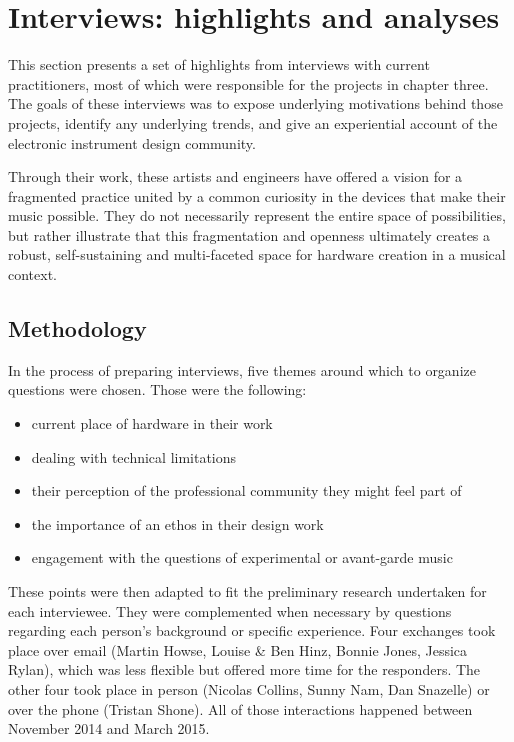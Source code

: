 \chapter{Interviews: highlights and analyses}\label{interviews}
This section presents a set of highlights from interviews with current practitioners, most of which were responsible for the projects in chapter three. The goals of these interviews was to expose underlying motivations behind those projects, identify any underlying trends, and give an experiential account of the electronic instrument design community. 

Through their work, these artists and engineers have offered a vision for a fragmented practice united by a common curiosity in the devices that make their music possible. They do not necessarily represent the entire space of possibilities, but rather illustrate that this fragmentation and openness ultimately creates a robust, self-sustaining and multi-faceted space for hardware creation in a musical context.

\section{Methodology}

In the process of preparing interviews, five themes around which to organize questions were chosen. Those were the following: 

\begin{itemize}
	\item current place of hardware in their work 
	\item dealing with technical limitations
	\item their perception of the professional community they might feel part of
	\item the importance of an ethos in their design work
	\item engagement with the questions of experimental or avant-garde music 
	\end{itemize}

These points were then adapted to fit the preliminary research undertaken for each interviewee. They were complemented when necessary by questions regarding each person's background or specific experience. Four exchanges took place over email (Martin Howse, Louise \& Ben Hinz, Bonnie Jones, Jessica Rylan), which was less flexible but offered more time for the responders. The other four took place in person (Nicolas Collins, Sunny Nam, Dan Snazelle) or over the phone (Tristan Shone). All of those interactions happened between November 2014 and March 2015. 

